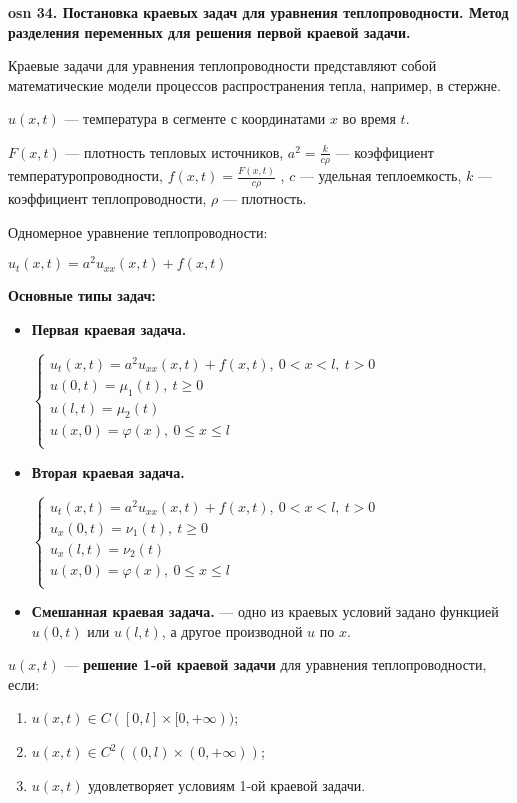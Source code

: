 \setcounter{section}{15}
\setcounter{subsection}{34}
\setcounter{equation}{0}
\textbf{\LARGE osn 34. Постановка краевых задач для уравнения теплопроводности.  Метод разделения переменных для решения первой краевой задачи.}

Краевые задачи для уравнения теплопроводности представляют собой математические модели процессов распространения тепла, например, в стержне.
    
$u(x,t)$ --- температура в сегменте с координатами $x$ во время $t$.

$F(x, t)$ --- плотность тепловых источников, $a^2 = \frac{k}{c\rho}$ --- коэффициент температуропроводности, $f(x,t)=\frac{F(x,t)}{c\rho}$ , $c$ --- удельная теплоемкость, $k$ --- коэффициент теплопроводности, $\rho$ --- плотность.

\bigbreak

Одномерное уравнение теплопроводности:

$u_t(x,t)=a^2u_{xx}(x,t)+f(x,t)$


\textbf{Основные типы задач:}
\begin{itemize}
    \item \textbf{Первая краевая задача.}
    
    $\begin{cases}
    u_t(x,t)=a^2u_{xx}(x,t)+f(x,t),~0<x<l,~t>0&\\
    u(0,t)=\mu_1(t),~t\geqslant0&\\
    u(l,t)=\mu_2(t)&\\
    u(x,0)=\varphi(x),~0\leqslant x\leqslant l&\\
    \end{cases}$
    \item \textbf{Вторая краевая задача.}
    
    $\begin{cases}
    u_t(x,t)=a^2u_{xx}(x,t)+f(x,t),~0<x<l,~t>0&\\
    u_x(0,t)=\nu_1(t),~t\geqslant0&\\
    u_x(l,t)=\nu_2(t)&\\
    u(x,0)=\varphi(x),~0\leqslant x\leqslant l&\\
    \end{cases}$
    \item \textbf{Смешанная краевая задача.} --- одно из краевых условий задано функцией $u(0,t)$ или $u(l,t)$, а другое производной $u$ по $x$.
\end{itemize}

$u(x,t)$ --- \textbf{решение 1-ой краевой задачи} для уравнения теплопроводности, если:
\begin{enumerate}
    \item $u(x,t)\in C([0,l]\times[0,+\infty))$;
    \item $u(x,t)\in C^2((0,l)\times(0,+\infty))$;
    \item $u(x,t)$ удовлетворяет условиям 1-ой краевой задачи.
\end{enumerate}

